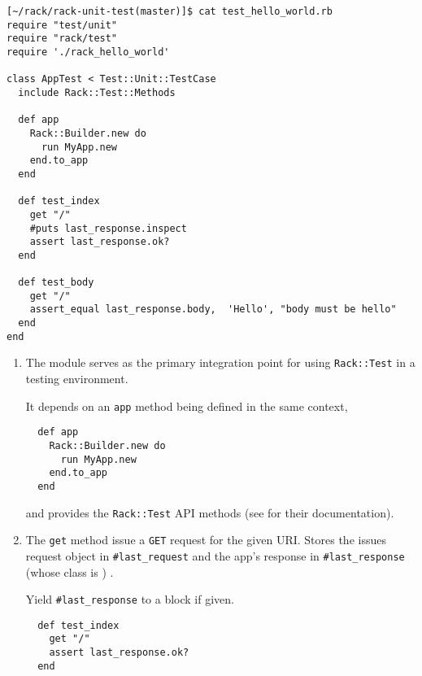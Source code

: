 \begin{verbatim}
[~/rack/rack-unit-test(master)]$ cat test_hello_world.rb 
require "test/unit"
require "rack/test"
require './rack_hello_world'

class AppTest < Test::Unit::TestCase
  include Rack::Test::Methods

  def app
    Rack::Builder.new do
      run MyApp.new
    end.to_app
  end

  def test_index
    get "/"
    #puts last_response.inspect
    assert last_response.ok?
  end

  def test_body
    get "/"
    assert_equal last_response.body,  'Hello', "body must be hello"
  end
end
\end{verbatim}
\begin{enumerate}
\item 
The 
module serves as the primary integration point for using
\verb|Rack::Test| in a testing environment. 

It depends on an \verb|app| method
being defined in the same context, 
\begin{verbatim}
  def app
    Rack::Builder.new do
      run MyApp.new
    end.to_app
  end
\end{verbatim}

and provides the \verb|Rack::Test| API
methods (see 
for their documentation).
\item 
The \verb|get| method issue a \verb|GET| request for the given URI.
Stores the issues request object in \verb|#last_request| and the app's response in 
\verb|#last_response| (whose class is 
) . 

Yield \verb|#last_response| to a block if given.
\begin{verbatim}
  def test_index
    get "/"
    assert last_response.ok?
  end
\end{verbatim}


\end{enumerate}
